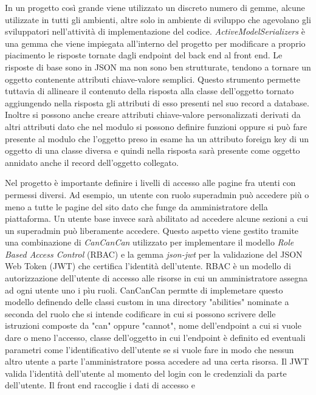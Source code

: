 \documentclass[target=bach,aauheader=,style=]{thud}
\begin{document}
In un progetto così grande viene utilizzato un discreto numero di gemme, alcune utilizzate in tutti gli ambienti, altre solo in ambiente
di sviluppo che agevolano gli sviluppatori nell'attività di implementazione del codice.
\textit{ActiveModelSerializers}\cite{active_model_serializers_gem} è una gemma che viene impiegata all'interno del progetto per modificare a proprio
piacimento le risposte tornate dagli endpoint del back end al front end. Le risposte di base sono in JSON ma non sono ben strutturate, tendono a tornare un oggetto
contenente attributi chiave-valore semplici. Questo strumento permette tuttavia di allineare il contenuto della risposta alla classe dell'oggetto tornato aggiungendo
nella risposta gli attributi di esso presenti nel suo record a database. Inoltre si possono anche creare attributi chiave-valore personalizzati derivati da altri
attributi dato che nel modulo si possono definire funzioni oppure si può fare presente al modulo che l'oggetto preso in esame ha un attributo foreign key di un
oggetto di una classe diversa e quindi nella risposta sarà presente come oggetto annidato anche il record dell'oggetto collegato.
\par Nel progetto è importante definire i livelli di accesso alle pagine fra utenti con permessi diversi. Ad esempio, un utente con ruolo superadmin può accedere
più o meno a tutte le pagine del sito dato che funge da amministratore della piattaforma. Un utente base invece sarà abilitato ad accedere alcune sezioni a cui
un superadmin può liberamente accedere. Questo aspetto viene gestito tramite una combinazione di \textit{CanCanCan}\cite{cancancan_gem} utilizzato per implementare
il modello \textit{Role Based Access Control} (RBAC)\cite{ibm_rbac} e la gemma \textit{json-jwt}\cite{json_jwt_gem} per la validazione del JSON Web Token (JWT) che
certifica l'identità dell'utente. RBAC è un modello di autorizzazione dell'utente di accesso alle risorse in cui un amministratore assegna ad ogni utente uno i pìu ruoli.
CanCanCan permtte di implemetare questo modello definendo delle classi custom in una directory "abilities" nominate a seconda del ruolo che si intende codificare
in cui si possono scrivere delle istruzioni composte da "can" oppure "cannot", nome dell'endpoint a cui si vuole dare o meno l'accesso, classe dell'oggetto in cui
l'endpoint è definito ed eventuali parametri come l'identificativo dell'utente se si vuole fare in modo che nessun altro utente a parte l'amministratore possa accedere
ad una certa risorsa. 
Il JWT valida l'identità dell'utente al momento del login con le credenziali da parte dell'utente. Il front end raccoglie i dati di accesso e
\end{document}
